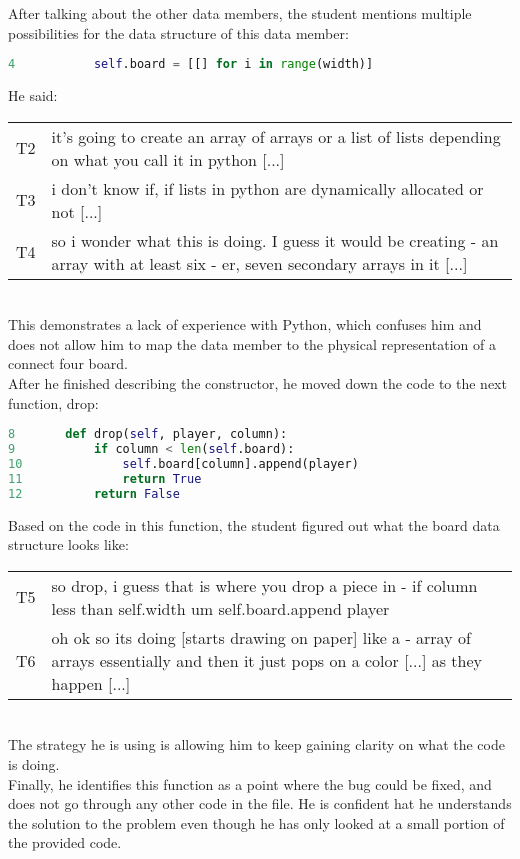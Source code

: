 After talking about the other data members, the student mentions multiple possibilities for the data structure of this data member:
\begin{lstlisting}[language=python]
4 			self.board = [[] for i in range(width)]
\end{lstlisting}

He said: \\
\begin{tabular}{lp{13cm}}
T2& it's going to create an array of arrays or a list of lists depending on what you call it in python [...] \\
T3& i don't know if, if lists in python are dynamically allocated or not [...] \\
T4& so i wonder what this is doing. I guess it would be creating - an array with at least six - er, seven secondary arrays in it [...]\\
\end{tabular}\\
This demonstrates a lack of experience with Python, which confuses him and does not allow him to map the data member to the physical representation of a connect four board. \\


After he finished describing the constructor, he moved down the code to the next function, drop:
\begin{lstlisting}[language=python]
8 		def drop(self, player, column):
9 			if column < len(self.board):
10				self.board[column].append(player)
11				return True
12			return False
\end{lstlisting} 

Based on the code in this function, the student figured out what the board data structure looks like: \\
\begin{tabular}{lp{13cm}}
T5& so drop, i guess that is where you drop a piece in - if column less than self.width um self.board.append player \\
T6&oh ok so its doing  [starts drawing on paper] like a - array of arrays essentially and then it just pops on a color [...] as they happen [...] \\
\end{tabular}\\
The strategy he is using is allowing him to keep gaining clarity on what the code is doing. \\

Finally, he identifies this function as a point where the bug could be fixed, and does not go through any other code in the file. 
He is confident hat he understands the solution to the problem even though he has only looked at a small portion of the provided code. 



